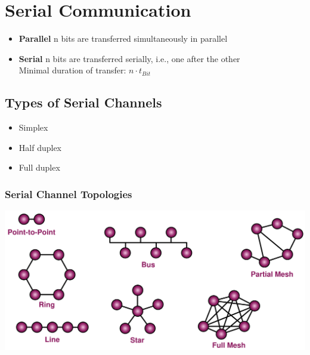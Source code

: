 \section{Serial Communication }

\begin{itemize}
	\itemsep-.5em 
	\item \textbf{Parallel} n bits are transferred simultaneously in parallel
	\item \textbf{Serial} n bits are transferred serially, i.e., one after the other \\ Minimal duration of transfer: $n \cdot t_{Bit}$
\end{itemize}

\subsection{Types of Serial Channels }
\begin{itemize}
	\itemsep-.5em 
	\item Simplex
	\item Half duplex
	\item Full duplex
\end{itemize}

\subsubsection{Serial Channel Topologies}
\begin{center}
	\includegraphics[width=.9\columnwidth]{"Images/Serial_Channel_Topologies.png"}
\end{center}



